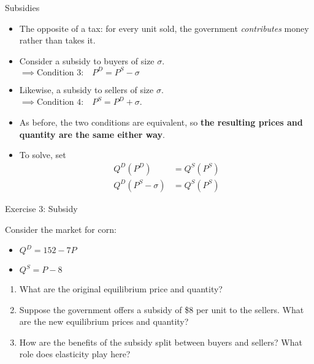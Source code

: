 \documentclass[9pt, handout]{beamer}
\begin{document}
\begin{frame}{Subsidies}
    \begin{itemize}
        \item The opposite of a tax: for every unit sold, the government \textit{contributes} money rather than takes it.
        \vspace{5pt}
        \item Consider a subsidy to buyers of size $\sigma$.\\
        $\implies \text{Condition 3:} \quad P^D = P^S - \sigma$
        \item Likewise, a subsidy to sellers of size $\sigma$.\\
        $\implies \text{Condition 4:} \quad P^S = P^D + \sigma$.
        \vspace{5pt}
        \item As before, the two conditions are equivalent, so \textbf{the resulting prices and quantity are the same either way}.
        \item To solve, set
        \begin{align*}
            Q^D(P^D) &= Q^S(P^S)\\
            Q^D(P^S - \sigma) &= Q^S(P^S)
        \end{align*}
    \end{itemize}
\end{frame}

\begin{frame}{Exercise 3: Subsidy}

    Consider the market for corn:
    \begin{itemize}
        \item $Q^D = 152 - 7P$
        \item $Q^S = P - 8$
    \end{itemize}
    \vspace{10pt}
    \begin{enumerate}
        \item What are the original equilibrium price and quantity?
        \item Suppose the government offers a subsidy of \$8 per unit to the sellers. What are the new equilibrium prices and quantity?
        \item How are the benefits of the subsidy split between buyers and sellers?  What role does elasticity play here?
    \end{enumerate}
\end{frame}
\end{document}
